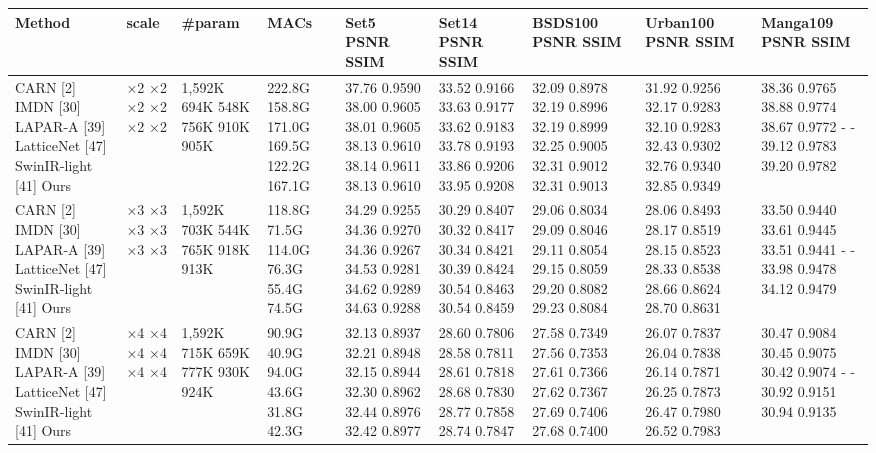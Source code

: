 \begin{tabular}{lllllllll}
\toprule
Method & scale & \#param & MACs & Set5 PSNR SSIM & Set14 PSNR SSIM & BSDS100 PSNR SSIM & Urban100 PSNR SSIM & Manga109 PSNR SSIM \\
\midrule
CARN [2] IMDN [30] LAPAR-A [39] LatticeNet [47] SwinIR-light [41] Ours & ×2 ×2 ×2 ×2 ×2 ×2 & 1,592K 694K 548K 756K 910K 905K & 222.8G 158.8G 171.0G 169.5G 122.2G 167.1G & 37.76 0.9590 38.00 0.9605 38.01 0.9605 38.13 0.9610 38.14 0.9611 38.13 0.9610 & 33.52 0.9166 33.63 0.9177 33.62 0.9183 33.78 0.9193 33.86 0.9206 33.95 0.9208 & 32.09 0.8978 32.19 0.8996 32.19 0.8999 32.25 0.9005 32.31 0.9012 32.31 0.9013 & 31.92 0.9256 32.17 0.9283 32.10 0.9283 32.43 0.9302 32.76 0.9340 32.85 0.9349 & 38.36 0.9765 38.88 0.9774 38.67 0.9772 - - 39.12 0.9783 39.20 0.9782 \\
CARN [2] IMDN [30] LAPAR-A [39] LatticeNet [47] SwinIR-light [41] Ours & ×3 ×3 ×3 ×3 ×3 ×3 & 1,592K 703K 544K 765K 918K 913K & 118.8G 71.5G 114.0G 76.3G 55.4G 74.5G & 34.29 0.9255 34.36 0.9270 34.36 0.9267 34.53 0.9281 34.62 0.9289 34.63 0.9288 & 30.29 0.8407 30.32 0.8417 30.34 0.8421 30.39 0.8424 30.54 0.8463 30.54 0.8459 & 29.06 0.8034 29.09 0.8046 29.11 0.8054 29.15 0.8059 29.20 0.8082 29.23 0.8084 & 28.06 0.8493 28.17 0.8519 28.15 0.8523 28.33 0.8538 28.66 0.8624 28.70 0.8631 & 33.50 0.9440 33.61 0.9445 33.51 0.9441 - - 33.98 0.9478 34.12 0.9479 \\
CARN [2] IMDN [30] LAPAR-A [39] LatticeNet [47] SwinIR-light [41] Ours & ×4 ×4 ×4 ×4 ×4 ×4 & 1,592K 715K 659K 777K 930K 924K & 90.9G 40.9G 94.0G 43.6G 31.8G 42.3G & 32.13 0.8937 32.21 0.8948 32.15 0.8944 32.30 0.8962 32.44 0.8976 32.42 0.8977 & 28.60 0.7806 28.58 0.7811 28.61 0.7818 28.68 0.7830 28.77 0.7858 28.74 0.7847 & 27.58 0.7349 27.56 0.7353 27.61 0.7366 27.62 0.7367 27.69 0.7406 27.68 0.7400 & 26.07 0.7837 26.04 0.7838 26.14 0.7871 26.25 0.7873 26.47 0.7980 26.52 0.7983 & 30.47 0.9084 30.45 0.9075 30.42 0.9074 - - 30.92 0.9151 30.94 0.9135 \\
\bottomrule
\end{tabular}
